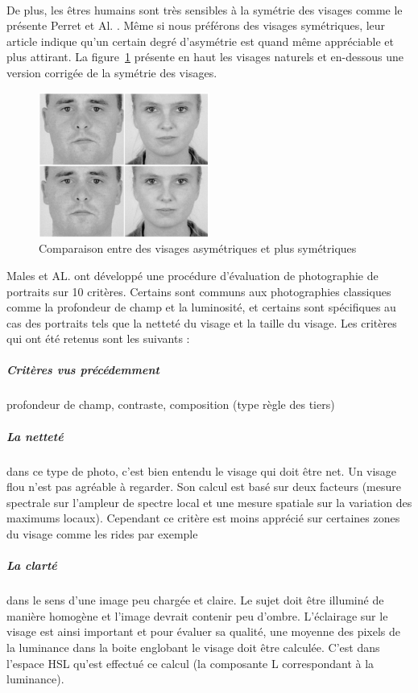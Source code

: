 \documentclass[11pt, french,screen]{report-rd-info}
\begin{document}
\paragraph*{}
De plus, les êtres humains sont très sensibles à la symétrie des visages comme le présente Perret et Al. \cite{Perrett1999}. Même si nous préférons des visages symétriques, leur article indique qu'un certain degré d'asymétrie est quand même appréciable et plus attirant. La figure~\ref{fig:VisagesSymetriques} présente en haut les visages naturels et en-dessous une version corrigée de la symétrie des visages.
\begin{figure}
	\centering
	\includegraphics[width=0.5\textwidth]{Images/ea_visages_symetriques}
	\caption{Comparaison entre des visages asymétriques et plus symétriques\cite{Perrett1999}}
	\label{fig:VisagesSymetriques}
\end{figure}
Males et AL. \cite{Males2013} ont développé une procédure d'évaluation de photographie de portraits sur 10 critères. Certains sont communs aux photographies classiques comme la profondeur de champ et la luminosité, et certains sont spécifiques au cas des portraits tels que la netteté du visage et la taille du visage. Les critères qui ont été retenus sont les suivants :
\subparagraph{Critères vus précédemment} profondeur de champ, contraste, composition (type règle des tiers)
\subparagraph{La netteté} dans ce type de photo, c'est bien entendu le visage qui doit être net. Un visage flou n'est pas agréable à regarder. Son calcul est basé sur deux facteurs (mesure spectrale sur l’ampleur de spectre local et une mesure spatiale sur la variation des maximums locaux). Cependant ce critère est moins apprécié sur certaines zones du visage comme les rides par exemple
\subparagraph{La clarté} dans le sens d'une image peu chargée et claire. Le sujet doit être illuminé de manière homogène et l’image devrait contenir peu d’ombre. L’éclairage sur le visage est ainsi important et pour évaluer sa qualité, une moyenne des pixels de la luminance dans la boite englobant le visage doit être calculée. C’est dans l’espace HSL qu’est effectué ce calcul (la composante L correspondant à la luminance).
\end{document}
